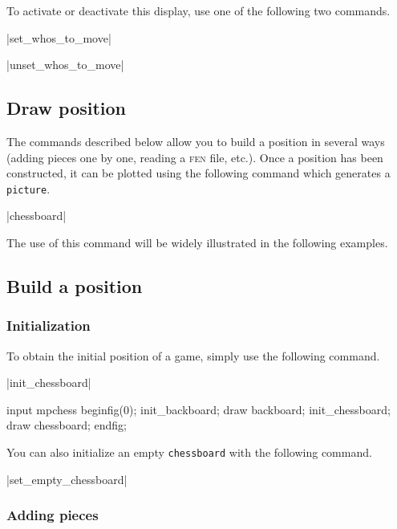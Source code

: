 \documentclass[english]{ltxdoc}
\begin{document}
To activate or deactivate this display, use one of the following two
commands.

\commande|set_whos_to_move|\smallskip


\commande|unset_whos_to_move|\smallskip

\subsection{Draw position}

The commands described below allow you to build a position in several ways
(adding pieces one by one, reading a \textsc{fen} file, etc.). Once a position
has been constructed, it can be plotted 
using the following command which generates a \MP{} \lstinline+picture+.


\commande|chessboard|\smallskip \label{com:chessboard}

The use of this command will be widely illustrated in the following examples.

\subsection{Build a position}

\subsubsection{Initialization}

To obtain the initial position of a game, simply use the following command.

\commande|init_chessboard|\smallskip

\begin{ExempleMP}
input mpchess
beginfig(0);
init_backboard;
draw backboard;
init_chessboard;
draw chessboard;
endfig;
\end{ExempleMP}

You can also initialize an empty \lstinline+chessboard+ with the following command. 

\commande|set_empty_chessboard|\smallskip

\subsubsection{Adding pieces}
\end{document}
